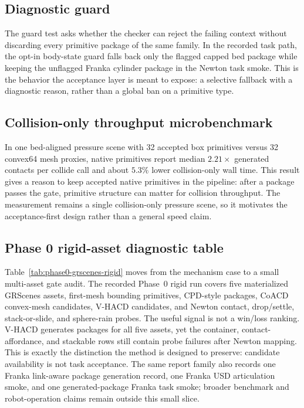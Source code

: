 \subsection{Diagnostic guard}
The guard test asks whether the checker can reject the failing context without discarding every primitive package of the same family.
In the recorded task path, the opt-in body-state guard falls back only the flagged capped bed package while keeping the unflagged Franka cylinder package in the Newton task smoke.
This is the behavior the acceptance layer is meant to expose: a selective fallback with a diagnostic reason, rather than a global ban on a primitive type.

\subsection{Collision-only throughput microbenchmark}
In one bed-aligned pressure scene with 32 accepted box primitives versus 32 convex64 mesh proxies, native primitives report median $2.21\times$ generated contacts per collide call and about $5.3\%$ lower collision-only wall time.
This result gives a reason to keep accepted native primitives in the pipeline: after a package passes the gate, primitive structure can matter for collision throughput.
The measurement remains a single collision-only pressure scene, so it motivates the acceptance-first design rather than a general speed claim.

\subsection{Phase 0 rigid-asset diagnostic table}
Table~\ref{tab:phase0-grscenes-rigid} moves from the mechanism case to a small multi-asset gate audit.
The recorded Phase~0 rigid run covers five materialized GRScenes assets, first-mesh bounding primitives, CPD-style packages, CoACD convex-mesh candidates, V-HACD candidates, and Newton contact, drop/settle, stack-or-slide, and sphere-rain probes.
The useful signal is not a win/loss ranking.
V-HACD generates packages for all five assets, yet the container, contact-affordance, and stackable rows still contain probe failures after Newton mapping.
This is exactly the distinction the method is designed to preserve: candidate availability is not task acceptance.
The same report family also records one Franka link-aware package generation record, one Franka USD articulation smoke, and one generated-package Franka task smoke; broader benchmark and robot-operation claims remain outside this small slice.

